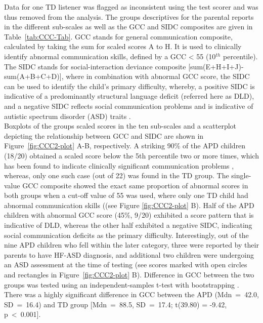 \documentclass[a4paper, twoside]{templates/ociamthesis}
\begin{document}
Data for one TD listener was flagged as inconsistent using the test scorer and was thus removed from the analysis. The groups descriptives for the parental reports in the different sub-scales as well as the GCC and SIDC composites are given in Table~\ref{tab:CCC-Tab}. GCC stands for general communication composite, calculated by taking the sum for scaled scores A to H. It is used to clinically identify abnormal communication skills, defined by a GCC \textless{} 55 (10\(^{th}\) percentile). The SIDC stands for social-interaction deviance composite {[}sum(E+H+I+J)-sum(A+B+C+D){]}, where in combination with abnormal GCC score, the SIDC can be used to identify the child's primary difficulty, whereby, a positive SIDC is indicative of a predominantly structural language deficit (referred here as DLD), and a negative SIDC reflects social communication problems and is indicative of autistic spectrum disorder (ASD) traits \autocite{Norbury2014,Bishop2003}.\\

Boxplots of the groups scaled scores in the ten sub-scales and a scatterplot depicting the relationship between GCC and SIDC are shown in Figure~\ref{fig:CCC2-plot} A-B, respectively. A striking 90\% of the APD children (18/20) obtained a scaled score below the 5th percentile two or more times, which has been found to indicate clinically significant communication problems \autocite{Bishop2003}, whereas, only one such case (out of 22) was found in the TD group. The single-value GCC composite showed the exact same proportion of abnormal scores in both groups when a cut-off value of 55 was used, where only one TD child had abnormal communication skills ((see Figure \ref{fig:CCC2-plot} B). Half of the APD children with abnormal GCC score (45\%, 9/20) exhibited a score pattern that is indicative of DLD, whereas the other half exhibited a negative SIDC, indicating social communication deficits as the primary difficulty. Interestingly, out of the nine APD children who fell within the later category, three were reported by their parents to have HF-ASD diagnosis, and additional two children were undergoing an ASD assessment at the time of testing (see scores marked with open circles and rectangles in Figure~\ref{fig:CCC2-plot} B). Difference in GCC between the two groups was tested using an independent-samples t-test with bootstrapping \autocite[\emph{MKinfer::boot.t.test()}, n=9999;][]{MKinferPackageR}. There was a highly significant difference in GCC between the APD (Mdn~=~42.0, SD~=~16.4) and TD group {[}Mdn~=~88.5, SD~=~17.4; t(39.80) = -9.42, p~\textless~0.001{]}.\\
\end{document}
